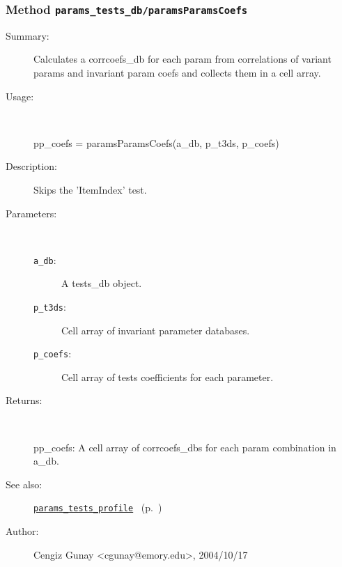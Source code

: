\subsubsection[Method \texttt{paramsParamsCoefs}]{Method \texttt{params\_tests\_db/paramsParamsCoefs}}%
%
\label{ref_params_tests_db__paramsParamsCoefs}%
\hypertarget{ref_params_tests_db__paramsParamsCoefs}{}%
\begin{description}
\item[Summary:]Calculates a corrcoefs\_db for each param from correlations of variant params and invariant param coefs and collects them in a cell array.
%
\item[Usage:]~%
\begin{lyxcode}%
pp\_coefs = paramsParamsCoefs(a\_db, p\_t3ds, p\_coefs)
%
\end{lyxcode}%
%
\item[Description:]%
Skips the 'ItemIndex' test.
\item[Parameters:]~
\begin{description}%
\item[\texttt{a\_db}:]
 A tests\_db object.
\item[\texttt{p\_t3ds}:]
 Cell array of invariant parameter databases.
\item[\texttt{p\_coefs}:]
 Cell array of tests coefficients for each parameter.
\end{description}%
%
\item[Returns:
]~

	pp\_coefs: A cell array of corrcoefs\_dbs for each param 
		  combination in a\_db.
%
%
\item[See also:]%
\hyperlink{ref_params_tests_profile}{\texttt{params\_tests\_profile}}%
\ (p.~\pageref{ref_params_tests_profile})%
%
%
\item[Author:]%
Cengiz Gunay <cgunay@emory.edu>, 2004/10/17
%
\end{description}
\methodline%
